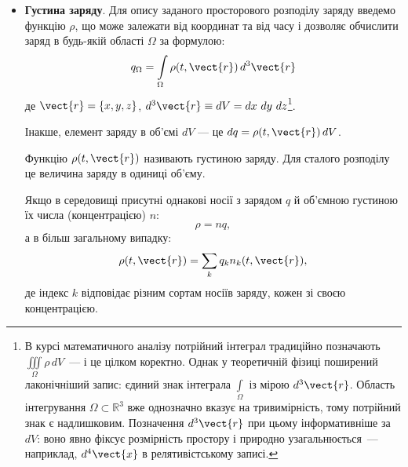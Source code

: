 \begin{itemize}
	\item  \textbf{Густина заряду}. Для опису заданого просторового розподілу заряду введемо
	      функцію $\rho$, що може залежати від координат та від часу і дозволяє обчислити заряд в будь-якій області
	      $\Omega$ за формулою:
	      \begin{equation}\label{eq:q}
		      q_{\Omega} = \int\limits_{\Omega} \rho(t, \vect{r}) \, d^3\vect{r}
	      \end{equation}
	      де $\vect{r} = \left\{x, y, z\right\}$, $d^3\vect{r} \equiv dV=dx\ dy\ dz$\footnote{%
		      В курсі математичного аналізу потрійний інтеграл традиційно позначають
		      $\iiint\limits_{\Omega}\rho\,dV$~--- і це цілком коректно. Однак у теоретичній фізиці поширений
		      лаконічніший запис: єдиний знак інтеграла $\int\limits_{\Omega}$ із мірою $d^3\vect{r}$. Область
		      інтегрування $\Omega \subset \mathbb{R}^3$ вже однозначно вказує на тривимірність, тому потрійний знак є
		      надлишковим. Позначення $d^3\vect{r}$ при цьому інформативніше за $dV$: воно явно фіксує розмірність
		      простору і природно узагальнюється~--- наприклад, $d^4\vect{x}$ в релятивістському записі. }.

	      Інакше, елемент заряду в об'ємі $dV$ --- це $dq = \rho(t, \vect{r})\, dV$.

	      Функцію $\rho(t, \vect{r})$ називають густиною заряду. Для сталого розподілу це величина
	      заряду в одиниці об'єму.

	      Якщо в середовищі присутні однакові носії з зарядом $q$ й об'ємною густиною їх числа (концентрацією) $n$:
	      \begin{equation}
		      \rho = nq,
	      \end{equation}
	      а в більш загальному випадку:
	      \begin{equation}
		      \rho(t, \vect{r}) = \sum\limits_k q_kn_k(t, \vect{r}),
	      \end{equation}
	      де індекс $k$ відповідає різним сортам носіїв заряду, кожен зі своєю концентрацією.



\end{itemize}

